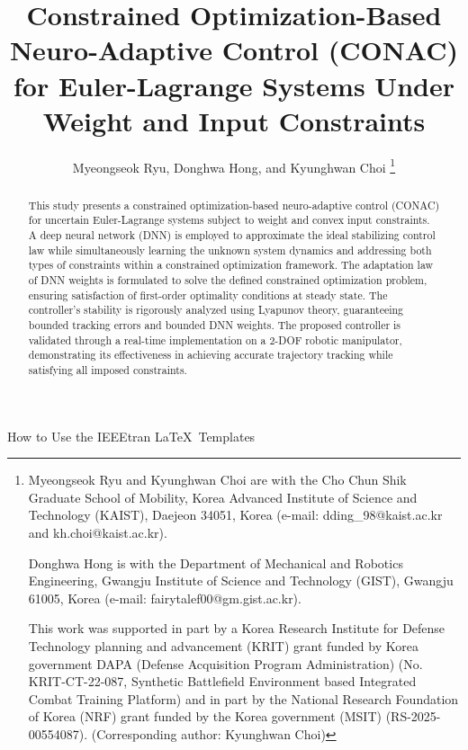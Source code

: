 \documentclass[journal]{IEEEtran}
\begin{document}
\title{
    Constrained Optimization-Based Neuro-Adaptive Control (CONAC) for Euler-Lagrange Systems Under Weight and Input Constraints
} %

\author{
  Myeongseok Ryu, Donghwa Hong, and Kyunghwan Choi
\thanks{
    Myeongseok Ryu and Kyunghwan Choi are with the Cho Chun Shik Graduate School of Mobility, Korea Advanced Institute of Science and Technology (KAIST), Daejeon 34051, Korea (e-mail: dding\_98@kaist.ac.kr and kh.choi@kaist.ac.kr).

    Donghwa Hong is with the Department of Mechanical and Robotics Engineering, Gwangju Institute of Science and Technology (GIST), Gwangju 61005, Korea (e-mail: fairytalef00@gm.gist.ac.kr).

    This work was supported in part by a Korea Research Institute for Defense Technology planning and advancement (KRIT) grant funded by Korea government DAPA (Defense Acquisition Program Administration) (No. KRIT-CT-22-087, Synthetic Battlefield Environment based Integrated Combat Training Platform) and in part by the National Research Foundation of Korea (NRF) grant funded by the Korea government (MSIT) (RS-2025- 00554087). (Corresponding author: Kyunghwan Choi)
    }}

%
{How to Use the IEEEtran \LaTeX \ Templates}

\maketitle

\begin{abstract}
  This study presents a constrained optimization-based neuro-adaptive control (CONAC) for uncertain Euler-Lagrange systems subject to weight and convex input constraints. 
  A deep neural network (DNN) is employed to approximate the ideal stabilizing control law while simultaneously learning the unknown system dynamics and addressing both types of constraints within a constrained optimization framework.
  The adaptation law of DNN weights is formulated to solve the defined constrained optimization problem, ensuring satisfaction of first-order optimality conditions at steady state.
  The controller's stability is rigorously analyzed using Lyapunov theory, guaranteeing bounded tracking errors and bounded DNN weights. 
  The proposed controller is validated through a real-time implementation on a 2-DOF robotic manipulator, demonstrating its effectiveness in achieving accurate trajectory tracking while satisfying all imposed constraints.
\end{abstract}
\end{document}
